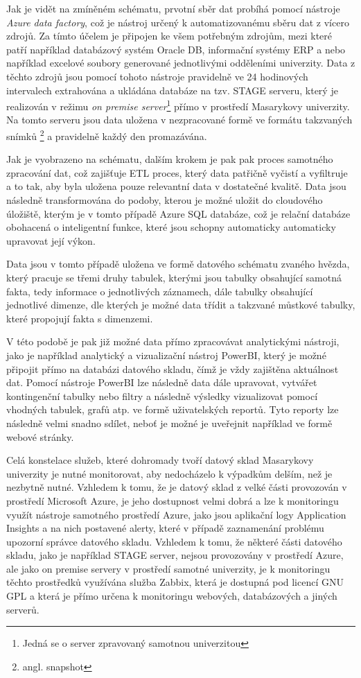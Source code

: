 \documentclass[
  digital,     %
  twoside,     %
  lof,         %
  lot,         %
]{fithesis4}
\begin{document}
Jak je vidět na zmíněném schématu, prvotní sběr dat probíhá pomocí nástroje \emph{Azure data factory}, což je nástroj určený k automatizovanému sběru dat z vícero zdrojů. Za tímto účelem je připojen ke všem potřebným zdrojům, mezi které patří například databázový systém Oracle DB, informační systémy ERP a nebo například excelové soubory generované jednotlivými odděleními univerzity. Data z těchto zdrojů jsou pomocí tohoto nástroje pravidelně ve 24 hodinových intervalech extrahována a ukládána databáze na tzv. STAGE serveru, který je realizován v režimu \emph{on premise server}\footnote{Jedná se o server zpravovaný samotnou univerzitou} přímo v prostředí Masarykovy univerzity. Na tomto serveru jsou data uložena v nezpracované formě ve formátu takzvaných snímků \footnote{angl. snapshot} a pravidelně každý den promazávána.

Jak je vyobrazeno na schématu, dalším krokem je pak pak proces samotného zpracování dat, což zajišťuje ETL proces, který data patřičně vyčistí a vyfiltruje a to tak, aby byla uložena pouze relevantní data v dostatečné kvalitě. Data jsou následně transformována do podoby, kterou je možné uložit do cloudového úložiště, kterým je v tomto případě Azure SQL databáze, což je relační databáze obohacená o inteligentní funkce, které jsou schopny automaticky automaticky upravovat její výkon.

Data jsou v tomto případě uložena ve formě datového schématu zvaného hvězda, který pracuje se třemi druhy tabulek, kterými jsou tabulky obsahující samotná fakta, tedy informace o jednotlivých záznamech, dále tabulky obsahující jednotlivé dimenze, dle kterých je možné data třídit a takzvané můstkové tabulky, které propojují fakta s dimenzemi. 

V této podobě je pak již možné data přímo zpracovávat analytickými nástroji, jako je například analytický a vizualizační nástroj PowerBI, který je možné připojit přímo na databázi datového skladu, čímž je vždy zajištěna aktuálnost dat. Pomocí nástroje PowerBI lze následně data dále upravovat, vytvářet kontingenční tabulky nebo filtry a následně výsledky vizualizovat pomocí vhodných tabulek, grafů atp. ve formě uživatelských reportů. Tyto reporty lze následně velmi snadno sdílet, neboť je možné je uveřejnit například ve formě webové stránky.

Celá konstelace služeb, které dohromady tvoří datový sklad Masarykovy univerzity je nutné monitorovat, aby nedocházelo k výpadkům delším, než je nezbytně nutné. Vzhledem k tomu, že je datový sklad z velké části provozován v prostředí Microsoft Azure, je jeho dostupnost velmi dobrá a lze k monitoringu využít nástroje samotného prostředí Azure, jako jsou aplikační logy Application Insights a na nich postavené alerty, které v případě zaznamenání problému upozorní správce datového skladu. Vzhledem k tomu, že některé části datového skladu, jako je například STAGE server, nejsou provozovány v prostředí Azure, ale jako on premise servery v prostředí samotné univerzity, je k monitoringu těchto prostředků využívána služba Zabbix, která je dostupná pod licencí GNU GPL a která je přímo  určena k monitoringu webových, databázových a jiných serverů.
\end{document}
